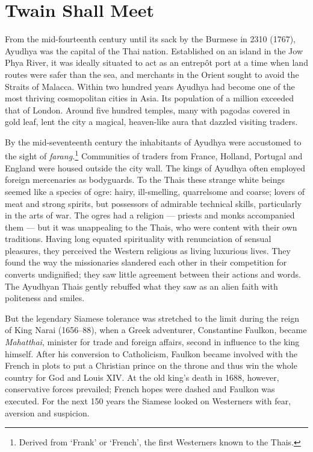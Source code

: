 

\chapter{Twain Shall Meet}
\markright{\chapterAuthor}

From the mid-fourteenth century until its sack by the Burmese in 2310
(1767), Ayudhya was the capital of the Thai nation. Established on an
island in the Jow Phya River, it was ideally situated to act as an
entrepôt port at a time when land routes were safer than the sea, and
merchants in the Orient sought to avoid the Straits of Malacca. Within
two hundred years Ayudhya had become one of the most thriving
cosmopolitan cities in Asia. Its population of a million exceeded that
of London. Around five hundred temples, many with pagodas covered in
gold leaf, lent the city a magical, heaven-like aura that dazzled
visiting traders.

By the mid-seventeenth century the inhabitants of Ayudhya were
accustomed to the sight of \emph{farang.}\footnote{Derived from `Frank'
  or `French', the first Westerners known to the Thais.} Communities of
traders from France, Holland, Portugal and England were housed outside
the city wall. The kings of Ayudhya often employed foreign mercenaries
as bodyguards. To the Thais these strange white beings seemed like a
species of ogre: hairy, ill-smelling, quarrelsome and coarse; lovers of
meat and strong spirits, but possessors of admirable technical skills,
particularly in the arts of war. The ogres had a religion --- priests
and monks accompanied them --- but it was unappealing to the Thais, who
were content with their own traditions. Having long equated spirituality
with renunciation of sensual pleasures, they perceived the Western
religious as living luxurious lives. They found the way the missionaries
slandered each other in their competition for converts undignified; they
saw little agreement between their actions and words. The Ayudhyan Thais
gently rebuffed what they saw as an alien faith with politeness and
smiles.

But the legendary Siamese tolerance was stretched to the limit during
the reign of King Narai (1656--88), when a Greek adventurer, Constantine
Faulkon, became \emph{Mahatthai}, minister for trade and foreign
affairs, second in influence to the king himself. After his conversion
to Catholicism, Faulkon became involved with the French in plots to put
a Christian prince on the throne and thus win the whole country for God
and Louis XIV. At the old king's death in 1688, however, conservative
forces prevailed; French hopes were dashed and Faulkon was executed. For
the next 150 years the Siamese looked on Westerners with fear, aversion
and suspicion.

